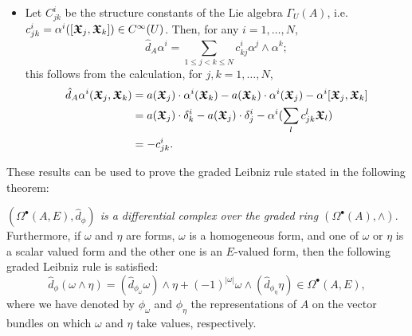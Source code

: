 \begin{itemize}
    \item Let $C^i_{jk}$ be the structure constants of the Lie algebra $\Gamma_U(A)$, i.e. $c^i_{jk} = \alpha^i([\bm{\mathfrak{X}}_j, \bm{\mathfrak{X}}_k]) \in C^\infty(U)$. Then, for any $i = 1, \dots, N$,
    \begin{equation}\label{equationDifferentialOfDual1FormsLocalFrame}
        \hat d_A \alpha^i = \sum_{1 \leq j < k \leq N} c^i_{k j} \alpha^j \wedge \alpha^k;
    \end{equation}
    this follows from the calculation, for $j, k = 1, \dots, N$,
    \begin{align*}
        \hat d_A \alpha^i(\bm{\mathfrak{X}}_j, \bm{\mathfrak{X}}_k) 
            &= a(\bm{\mathfrak{X}}_j)\cdot \alpha^i(\bm{\mathfrak{X}}_k) - a(\bm{\mathfrak{X}}_k)\cdot \alpha^i(\bm{\mathfrak{X}}_j) - \alpha^i[\bm{\mathfrak{X}}_j, \bm{\mathfrak{X}}_k]\\
            &= a(\bm{\mathfrak{X}}_j)\cdot \delta^i_k - a(\bm{\mathfrak{X}}_j)\cdot \delta^i_j - \alpha^i(\sum_l c^l_{jk} \bm{\mathfrak{X}}_l)\\
            &= -c^i_{jk}.
    \end{align*}
    
    \end{itemize}
These results can be used to prove the graded Leibniz rule stated in the following theorem:

\begin{theorem}\label{theoFormsAreDiffGModule}
 \textit{$(\Omega^\bullet(A, E), \hat d_\phi)$ is a differential complex over the graded ring $(\Omega^\bullet(A), \wedge)$}. Furthermore, if $\omega$ and $\eta$ are forms, $\omega$ is a homogeneous form, and one of $\omega$ or $\eta$ is a scalar valued form and the other one is an $E$-valued form, then the following graded Leibniz rule is satisfied:
 \begin{equation}\label{equationGradedLeibnizScalarAndEValuedVectorForms}
    \hat d_{\phi} (\omega \wedge \eta) = (\hat d_{\phi_\omega} \omega)\wedge\eta + (-1)^{|\omega|} \omega \wedge (\hat d_{\phi_\eta}\eta) \in \Omega^\bullet(A, E),
 \end{equation}
 where we have denoted by $\phi_{\omega}$ and $\phi_{\eta}$ the representations of $A$ on the vector bundles on which $\omega$ and $\eta$ take values, respectively.
\end{theorem}



